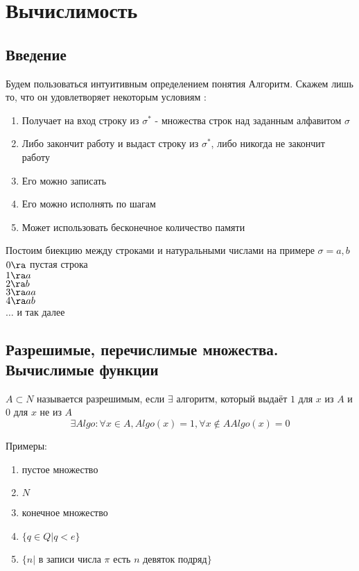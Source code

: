 \chapter{Вычислимость}
\section{Введение}
Будем пользоваться интуитивным определением понятия $Алгоритм$. Скажем лишь то, что он удовлетворяет некоторым условиям :
\begin{enumerate}
    \item Получает на вход строку из $\sigma^*$ - множества строк над заданным алфавитом $\sigma$
    \item Либо закончит работу и выдаст строку из $\sigma^*$, либо никогда не закончит работу
    \item Его можно записать
    \item Его можно исполнять по шагам
    \item Может использовать бесконечное количество памяти
\end{enumerate}

Постоим биекцию между строками и натуральными числами на примере $\sigma = {a, b}$\\
$0 \ra$ пустая строка\\
$1\ra a$\\
$2\ra b$\\
$3\ra aa$\\
$4\ra ab$\\
$\dots$ и так далее

\section{Разрешимые, перечислимые множества. Вычислимые функции}

\begin{Def}
	$A \subset N$ называется разрешимым, если $\exists$ алгоритм, который выдаёт $1$ для $x$ из $A$ и $0$ для $x$ не из $A$
	$$\exists Algo \colon \forall x \in A, Algo(x) = 1, \forall x \notin A Algo(x) = 0$$
\end{Def}

Примеры:
\begin{enumerate}
	\item пустое множество
	\item $N$
	\item конечное множество
	\item $\{q \in Q | q < e\}$
	\item $\{n|$ в записи числа $\pi$ есть $n$ девяток подряд$\}$
\end {enumerate}

